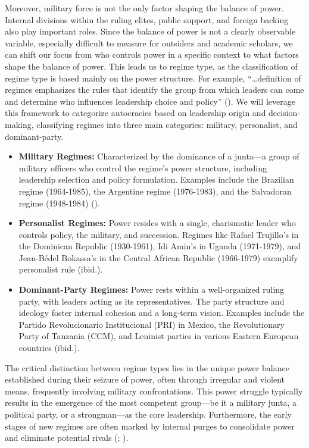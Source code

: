 \documentclass[
  12pt,
]{report}
\begin{document}
Moreover, military force is not the only factor shaping the balance of
power. Internal divisions within the ruling elites, public support, and
foreign backing also play important roles. Since the balance of power is
not a clearly observable variable, especially difficult to measure for
outsiders and academic scholars, we can shift our focus from who
controls power in a specific context to what factors shape the balance
of power. This leads us to regime type, as the classification of regime
type is based mainly on the power structure. For example,
``\ldots definition of regimes emphasizes the rules that identify the
group from which leaders can come and determine who influences
leadership choice and policy'' (). We will leverage this framework to
categorize autocracies based on leadership origin and decision-making,
classifying regimes into three main categories: military, personalist,
and dominant-party.

\begin{itemize}
\item
  \textbf{Military Regimes:} Characterized by the dominance of a
  junta---a group of military officers who control the regime's power
  structure, including leadership selection and policy formulation.
  Examples include the Brazilian regime (1964-1985), the Argentine
  regime (1976-1983), and the Salvadoran regime (1948-1984)
  ().
\item
  \textbf{Personalist Regimes:} Power resides with a single, charismatic
  leader who controls policy, the military, and succession. Regimes like
  Rafael Trujillo's in the Dominican Republic (1930-1961), Idi Amin's in
  Uganda (1971-1979), and Jean-Bédel Bokassa's in the Central African
  Republic (1966-1979) exemplify personalist rule (ibid.).
\item
  \textbf{Dominant-Party Regimes:} Power rests within a well-organized
  ruling party, with leaders acting as its representatives. The party
  structure and ideology foster internal cohesion and a long-term
  vision. Examples include the Partido Revolucionario Institucional
  (PRI) in Mexico, the Revolutionary Party of Tanzania (CCM), and
  Leninist parties in various Eastern European countries (ibid.).
\end{itemize}

The critical distinction between regime types lies in the unique power
balance established during their seizure of power, often through
irregular and violent means, frequently involving military
confrontations. This power struggle typically results in the emergence
of the most competent group---be it a military junta, a political party,
or a strongman---as the core leadership. Furthermore, the early stages
of new regimes are often marked by internal purges to consolidate power
and eliminate potential rivals (; ).
\end{document}

